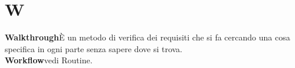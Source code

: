 \newpage
\section{W}\label{l:W}

\textbf{Walkthrough}\newline È un metodo di verifica dei requisiti che si fa cercando una cosa specifica in ogni parte senza sapere dove si trova.\\
\newline
\textbf{Workflow}\newline vedi Routine.